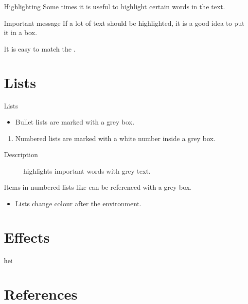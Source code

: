 \documentclass[UKenglish]{beamer}
\begin{document}
\begin{frame}{Highlighting}
    Some times it is useful to \alert{highlight} certain words in the text.
    
    \begin{alertblock}{Important message}
        If a lot of text should be \alert{highlighted}, it is a good idea to put it in a box.
    \end{alertblock}
    
    It is easy to match the .
\end{frame}


\section{Lists}


\begin{frame}{Lists}
    \begin{itemize}
        \item
        Bullet lists are marked with a grey box.
    \end{itemize}
    
    \begin{enumerate}
        \item
        \label{enum:item}
        Numbered lists are marked with a white number inside a grey box.
    \end{enumerate}

    \begin{description}
        \item[Description]
        highlights important words with grey text.
    \end{description}

    Items in numbered lists like  can be referenced with a grey box.

    \begin{example}
        \begin{itemize}
            \item
            Lists change colour after the environment.
        \end{itemize}
    \end{example}
\end{frame}


\section{Effects}
hei 

\section{References}
\end{document}
